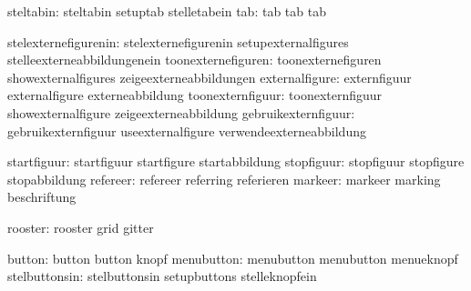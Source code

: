                     steltabin:  steltabin                    setuptab
                                stelletabein
                          tab:  tab                          tab
                                tab

         stelexternefigurenin:  stelexternefigurenin         setupexternalfigures
                                stelleexterneabbildungenein
           toonexternefiguren:  toonexternefiguren           showexternalfigures
                                zeigeexterneabbildungen
               externalfigure:  externfiguur                 externalfigure
                                externeabbildung
             toonexternfiguur:  toonexternfiguur             showexternalfigure
                                zeigeexterneabbildung
          gebruikexternfiguur:  gebruikexternfiguur          useexternalfigure
                                verwendeexterneabbildung

                  startfiguur:  startfiguur                  startfigure
                                startabbildung
                   stopfiguur:  stopfiguur                   stopfigure
                                stopabbildung
                     refereer:  refereer                     referring
                                referieren
                      markeer:  markeer                      marking
                                beschriftung

                      rooster:  rooster                      grid
                                gitter

                       button:  button                       button
                                knopf
                   menubutton:  menubutton                   menubutton
                                menueknopf
                stelbuttonsin:  stelbuttonsin                setupbuttons
                                stelleknopfein

